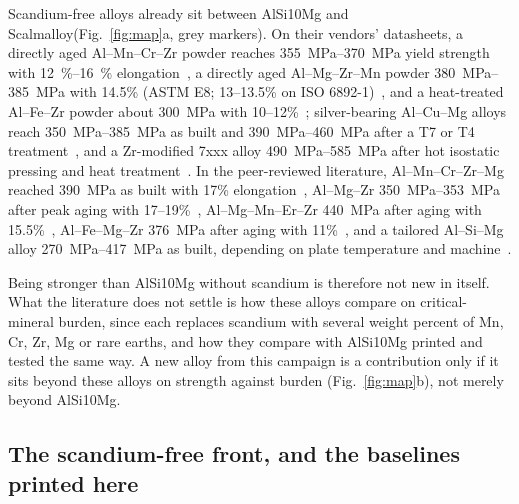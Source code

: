 \documentclass[preprint,12pt]{elsarticle}
\newcommand{\note}[1]{}
\newcommand{\note}[1]{\textcolor{blue!70!black}{\textsf{\footnotesize [Note: #1]}}}
\newcommand{\Scal}{Scalmalloy\xspace}
\newcommand{\AlSi}{AlSi10Mg\xspace}
\begin{document}
Scandium-free alloys already sit between \AlSi and \Scal (Fig.~\ref{fig:map}a, grey markers).
On their vendors' datasheets, a directly aged Al--Mn--Cr--Zr powder reaches \SIrange{355}{370}{MPa} yield strength with \SIrange{12}{16}{\%} elongation~\cite{ds_hoganas}, a directly aged Al--Mg--Zr--Mn powder \SIrange{380}{385}{MPa} with 14.5\% (ASTM E8; 13--13.5\% on ISO 6892-1)~\cite{ds_al5x1}, and a heat-treated Al--Fe--Zr powder about \SI{300}{MPa} with 10--12\%~\cite{ds_cp1}; silver-bearing Al--Cu--Mg alloys reach \SIrange{350}{385}{MPa} as built and \SIrange{390}{460}{MPa} after a T7 or T4 treatment~\cite{ds_al2139,ds_a20x}, and a Zr-modified 7xxx alloy \SIrange{490}{585}{MPa} after hot isostatic pressing and heat treatment~\cite{ds_7a77}.
In the peer-reviewed literature, Al--Mn--Cr--Zr--Mg reached \SI{390}{MPa} as built with 17\% elongation~\cite{almncrzr2024}, Al--Mg--Zr \SIrange{350}{353}{MPa} after peak aging with 17--19\%~\cite{croteau2018}, Al--Mg--Mn--Er--Zr \SI{440}{MPa} after aging with 15.5\%~\cite{almgmnerzr2022}, Al--Fe--Mg--Zr \SI{376}{MPa} after aging with 11\%~\cite{alfezr2025}, and a tailored Al--Si--Mg alloy \SIrange{270}{417}{MPa} as built, depending on plate temperature and machine~\cite{alsimg2020}.
\note{Checked against the sources on 27 Nov 2026 (data/literature-alloys.csv, read\_by column). Still unverified: the as-built Al--Mg--Mn--Er--Zr row and its exact Zr content, and the as-built elongation of Al--Fe--Mg--Zr (full texts blocked).}
Being stronger than \AlSi without scandium is therefore not new in itself.
What the literature does not settle is how these alloys compare on critical-mineral burden, since each replaces scandium with several weight percent of Mn, Cr, Zr, Mg or rare earths, and how they compare with \AlSi printed and tested the same way.
A new alloy from this campaign is a contribution only if it sits beyond these alloys on strength against burden (Fig.~\ref{fig:map}b), not merely beyond \AlSi.

\subsection{The scandium-free front, and the baselines printed here}
\label{sec:frontsec}
\end{document}
